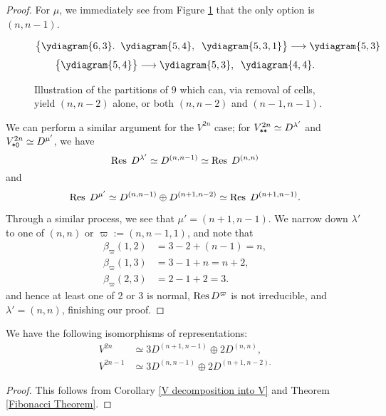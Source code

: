 \documentclass{amsart}
\begin{document}
\begin{proof}
  For $\mu$, we immediately see from Figure \ref{OddRes} that the only option is $(n,n-1)$.
  \begin{figure}
  \[
      \cbr{
        \begin{gathered}
        \ydiagram{6,3}. \; \;
        \ydiagram{5,4}, \; \;
        \ydiagram{5,3,1}
      \end{gathered} 
    }\longrightarrow \begin{gathered}
      \ydiagram{5,3}
  \end{gathered}\]
      \[\cbr{
        \begin{gathered}
          \ydiagram{5,4}
        \end{gathered}
      }\longrightarrow
      \begin{gathered}
        \ydiagram{5,3},\;\;
        \ydiagram{4,4}.
      \end{gathered}
    \]
      \caption{
      Illustration of the partitions of $9$ which can, via removal of cells, yield $(n,n-2)$ alone, or both $(n,n-2)$ and $(n-1,n-1)$.
    }\label{OddRes}
\end{figure}  
  
  We can perform a similar argument for the $V^{2n}$ case;
  for $V^{2n}_{\texttt{*}\texttt{*}} \simeq D^{\lambda'}$ and $V^{2n}_{\texttt{*}\texttt{0}} \simeq D^{\mu'}$, we have
  \[\operatorname{Res} \; D^{\lambda'} \simeq D^{(n,n-1)} \simeq \operatorname{Res} \; D^{(n,n)}\] and 
  \[\operatorname{Res} \; D^{\mu'} \simeq D^{(n,n-1)} \oplus D^{(n+1,n-2)} \simeq \operatorname{Res} \; D^{(n+1,n-1)}.\]
  
  Through a similar process, we see that $\mu' = (n+1,n-1)$.
  We narrow down $\lambda'$ to one of $(n,n)$ or $\varpi := (n,n-1,1)$, and note that
  \begin{align*} 
    \beta_\varpi(1,2) &= 3 - 2 + (n-1) = n,\\
    \beta_\varpi(1,3) &= 3 - 1 + n = n+2,\\
    \beta_\varpi(2,3) &= 2 - 1 + 2 = 3.
  \end{align*}
  and hence at least one of 2 or 3 is normal, $\operatorname{Res} D^{\varpi}$ is not irreducible, and $\lambda' = (n,n)$, finishing our proof.
\end{proof}
\begin{corollary}
  We have the following isomorphisms of representations:
  \begin{align*} 
    V^{2n} &\simeq 3D^{(n+1,n-1)} \oplus 2D^{(n,n)},\\
    V^{2n - 1} &\simeq 3D^{(n,n-1)} \oplus 2D^{(n+1,n-2).}
  \end{align*}
\end{corollary}
\begin{proof}
  This follows from Corollary \ref{V decomposition into V} and Theorem \ref{Fibonacci Theorem}.
\end{proof}
\end{document}
